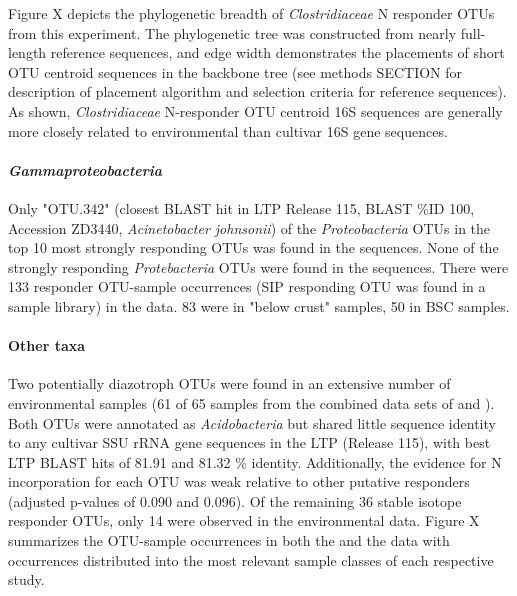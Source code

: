 Figure X depicts the phylogenetic breadth of \textit{Clostridiaceae} N responder OTUs from this experiment. The phylogenetic tree was constructed from nearly full-length reference sequences, and edge width demonstrates the placements of short OTU centroid sequences in the backbone tree (see methods SECTION for description of placement algorithm and selection criteria for reference sequences). As shown, \textit{Clostridiaceae} N-responder OTU centroid 16S sequences are generally more closely related to environmental than cultivar 16S gene sequences.   

\paragraph{\textit{Gammaproteobacteria}}
Only "OTU.342" (closest BLAST hit in LTP Release 115, BLAST \%ID 100, Accession ZD3440, \textit{Acinetobacter johnsonii}) of the \textit{Proteobacteria} OTUs in the top 10 most strongly responding OTUs was found in the \citet{Garcia_Pichel_2013} sequences. None of the strongly responding \textit{Protebacteria} OTUs were found in the \citet{Steven_2013} sequences. There were 133 responder OTU-sample occurrences (SIP responding OTU was found in a sample library) in the \citet{Steven_2013} data. 83 were in "below crust" samples, 50 in BSC samples.
\paragraph{Other taxa} 
Two potentially diazotroph OTUs were found in an extensive number of environmental samples (61 of 65 samples from the combined data sets of \citet{Garcia_Pichel_2013} and \citet{Steven_2013}). Both OTUs were annotated as \textit{Acidobacteria} but shared little sequence identity to any cultivar SSU rRNA gene sequences in the LTP (Release 115), with best LTP BLAST hits of 81.91 and 81.32 \% identity. Additionally, the evidence for N incorporation for each OTU was weak relative to other putative responders (adjusted p-values of 0.090 and 0.096). Of the remaining 36 stable isotope responder OTUs, only 14 were observed in the environmental data. Figure X summarizes the OTU-sample occurrences in both the \citet{Steven_2013} and the \citet{Garcia_Pichel_2013} data with occurrences distributed into the most relevant sample classes of each respective study.

